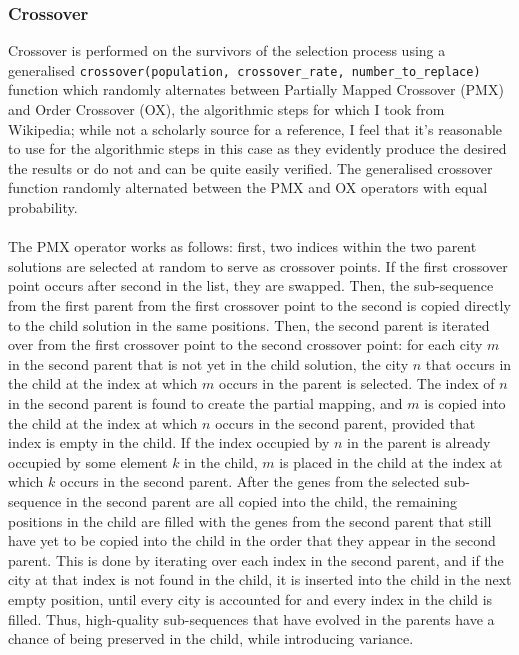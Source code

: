 \documentclass[a4paper]{article}
\begin{document}
\subsubsection{Crossover}
Crossover is performed on the survivors of the selection process using a generalised \texttt{crossover(population, crossover\_rate, number\_to\_replace)} function which randomly alternates between Partially Mapped Crossover (PMX) and Order Crossover (OX), the algorithmic steps for which I took from Wikipedia\supercite{crossover}; while not a scholarly source for a reference, I feel that it's reasonable to use for the algorithmic steps in this case as they evidently produce the desired the results or do not and can be quite easily verified.
The generalised crossover function randomly alternated between the PMX and OX operators with equal probability.
\\\\
The PMX operator works as follows:
first, two indices within the two parent solutions are selected at random to serve as crossover points.
If the first crossover point occurs after second in the list, they are swapped.
Then, the sub-sequence from the first parent from the first crossover point to the second is copied directly to the child solution in the same positions.
Then, the second parent is iterated over from the first crossover point to the second crossover point:
for each city $m$ in the second parent that is not yet in the child solution, the city $n$ that occurs in the child at the index at which $m$ occurs in the parent is selected.
The index of $n$ in the second parent is found to create the partial mapping, and $m$ is copied into the child at the index at which $n$ occurs in the second parent, provided that index is empty in the child.
If the index occupied by $n$ in the parent is already occupied by some element $k$ in the child, $m$ is placed in the child at the index at which $k$ occurs in the second parent.
After the genes from the selected sub-sequence in the second parent are all copied into the child, the remaining positions in the child are filled with the genes from the second parent that still have yet to be copied into the child in the order that they appear in the second parent.
This is done by iterating over each index in the second parent, and if the city at that index is not found in the child, it is inserted into the child in the next empty position, until every city is accounted for and every index in the child is filled.
Thus, high-quality sub-sequences that have evolved in the parents have a chance of being preserved in the child, while introducing variance.
\end{document}
